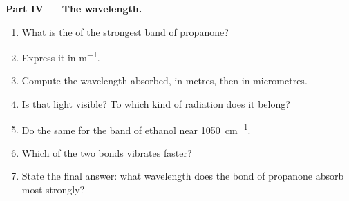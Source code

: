\begin{problem}
\medskip
\noindent\textbf{Part IV --- The wavelength.}
\begin{enumerate}[resume]
  \item What is the  of the strongest band of propanone?
  \item Express it in \si{m^{-1}}.
  \item Compute the wavelength absorbed, in metres, then in
        micrometres.
  \item Is that light visible? To which kind of radiation does it
        belong?
  \item Do the same for the  band of ethanol near
        \qty{1050}{cm^{-1}}.
  \item Which of the two bonds vibrates faster?
  \item State the final answer: what wavelength does the  bond of
        propanone absorb most strongly?
\end{enumerate}
\end{problem}
